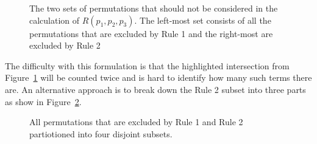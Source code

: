 \begin{figure}[H]
    \centering
    \caption{The two sets of permutations that should not be considered in the
    calculation of \(R(p_1, p_2, p_3)\). The left-most set consists of all the
    permutations that are excluded by Rule 1 and the right-most are excluded
    by Rule 2}
    \label{fig:venn_diagram_with_rules}
\end{figure}

The difficulty with this formulation is that the highlighted intersection from
Figure~\ref{fig:venn_diagram_with_rules} will
be counted twice and is hard to identify how many such terms there are.
An alternative approach is to break down the Rule 2 subset into three parts as
show in Figure~\ref{fig:venn_diagram_with_subsets}.

\begin{figure}[H]
    \centering
    \caption{All permutations that are excluded by Rule 1 and Rule 2
    partiotioned into four disjoint subsets.}
    \label{fig:venn_diagram_with_subsets}
\end{figure}

